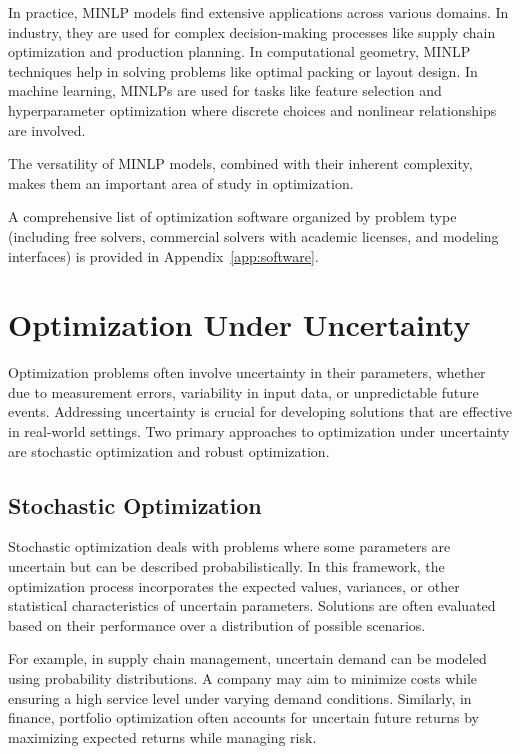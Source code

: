 In practice, MINLP models find extensive applications across various domains. In industry, they are used for complex decision-making processes like supply chain optimization and production planning. In computational geometry, MINLP techniques help in solving problems like optimal packing or layout design. In machine learning, MINLPs are used for tasks like feature selection and hyperparameter optimization where discrete choices and nonlinear relationships are involved.

The versatility of MINLP models, combined with their inherent complexity, makes them an important area of study in optimization.

A comprehensive list of optimization software organized by problem type (including free solvers, commercial solvers with academic licenses, and modeling interfaces) is provided in Appendix~\ref{app:software}.

\section{Optimization Under Uncertainty}

Optimization problems often involve uncertainty in their parameters, whether due to measurement errors, variability in input data, or unpredictable future events. Addressing uncertainty is crucial for developing solutions that are effective in real-world settings. Two primary approaches to optimization under uncertainty are stochastic optimization and robust optimization.

\subsection{Stochastic Optimization}

Stochastic optimization deals with problems where some parameters are uncertain but can be described probabilistically. In this framework, the optimization process incorporates the expected values, variances, or other statistical characteristics of uncertain parameters. Solutions are often evaluated based on their performance over a distribution of possible scenarios. 

For example, in supply chain management, uncertain demand can be modeled using probability distributions. A company may aim to minimize costs while ensuring a high service level under varying demand conditions. Similarly, in finance, portfolio optimization often accounts for uncertain future returns by maximizing expected returns while managing risk.

